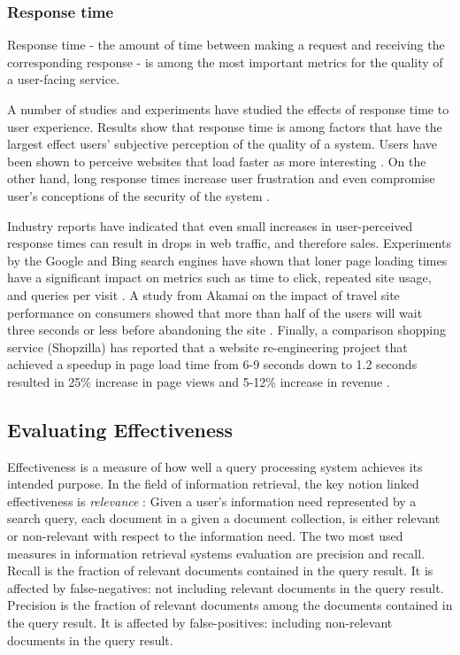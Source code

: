 \subsubsection{Response time}
Response time - the amount of time between making a request and receiving the corresponding response -
is among the most important metrics for the quality of a user-facing service.

A number of studies and experiments have studied the effects of response time to user experience.
Results show that response time is among factors that have the largest effect users' subjective perception of the
quality of a system.
Users have been shown to perceive websites that load faster as more interesting \cite{ramsay/retrievaltimesinvestigation}.
On the other hand, long response times increase user frustration \cite{ceaparu:userfrustration} and even compromise
user's conceptions of the security of the system \cite{bouch:qualityeyebeholder}.

Industry reports have indicated that even small increases in user-perceived response times can result in drops in web
traffic, and therefore sales.
Experiments by the Google and Bing search engines have shown that loner page loading times have a significant impact on
metrics such as time to click, repeated site usage, and queries per visit \cite{schurman:rerformanceuserimpact}.
A study from Akamai on the impact of travel site performance on consumers showed that more than half of the users will
wait three seconds or less before abandoning the site \cite{akamai:travelsiteperformance}.
Finally, a comparison shopping service (Shopzilla) has reported that a website re-engineering project that achieved a
speedup in page load time from 6-9 seconds down to 1.2 seconds resulted in 25\% increase in page views and 5-12\%
increase in revenue \cite{dixon:shopzillasiteredo}.

\subsection{Evaluating Effectiveness}

Effectiveness is a measure of how well a query processing system achieves its intended purpose.
In the field of information retrieval, the key notion linked effectiveness is \textit{relevance}
\cite{buttcher:informationretrieval}:
Given a user's information need represented by a search query, each document in a given a document collection, is either
relevant or non-relevant with respect to the information need.
The two most used measures in information retrieval systems evaluation are precision and recall.
Recall is the fraction of relevant documents contained in the query result.
It is affected by false-negatives: not including relevant documents in the query result.
Precision is the fraction of relevant documents among the documents contained in the query result.
It is affected by false-positives: including non-relevant documents in the query result.

